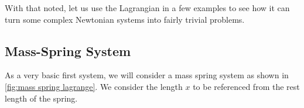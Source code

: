 \documentclass[12pt]{report}
\begin{document}
With that noted, let us use the \gls{Lagrangian} in a few examples to see how it can turn some complex Newtonian systems into fairly trivial problems.
\subsection{Mass-Spring System}
As a very basic first system, we will consider a mass spring system as shown in \ref{fig:mass spring lagrange}. We consider the length $x$ to be referenced from the rest length of the spring.
\begin{figure}[ht]

\centering


\begin{tikzpicture}[x=0.75pt,y=0.75pt,yscale=-1,xscale=1]


\end{tikzpicture}
\end{figure}
\end{document}
